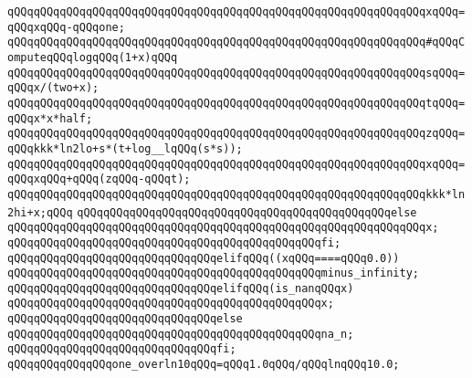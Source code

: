 \verb|qQQqqQQqqQQqqQQqqQQqqQQqqQQqqQQqqQQqqQQqqQQqqQQqqQQqqQQqqQQqqQQqxqQQq=qQQqxqQQq-qQQqone;|\newline
\newline
\verb|qQQqqQQqqQQqqQQqqQQqqQQqqQQqqQQqqQQqqQQqqQQqqQQqqQQqqQQqqQQqqQQq#qQQqComputeqQQqlogqQQq(1+x)qQQq|\newline
\newline
\verb|qQQqqQQqqQQqqQQqqQQqqQQqqQQqqQQqqQQqqQQqqQQqqQQqqQQqqQQqqQQqqQQqsqQQq=qQQqx/(two+x);|\newline
\verb|qQQqqQQqqQQqqQQqqQQqqQQqqQQqqQQqqQQqqQQqqQQqqQQqqQQqqQQqqQQqqQQqtqQQq=qQQqx*x*half;|\newline
\verb|qQQqqQQqqQQqqQQqqQQqqQQqqQQqqQQqqQQqqQQqqQQqqQQqqQQqqQQqqQQqqQQqzqQQq=qQQqkkk*ln2lo+s*(t+log__lqQQq(s*s));|\newline
\verb|qQQqqQQqqQQqqQQqqQQqqQQqqQQqqQQqqQQqqQQqqQQqqQQqqQQqqQQqqQQqqQQqxqQQq=qQQqxqQQq+qQQq(zqQQq-qQQqt);|\newline
\newline
\verb|qQQqqQQqqQQqqQQqqQQqqQQqqQQqqQQqqQQqqQQqqQQqqQQqqQQqqQQqqQQqqQQqkkk*ln2hi+x;qQQq|\newline
\newline
\verb|qQQqqQQqqQQqqQQqqQQqqQQqqQQqqQQqqQQqqQQqqQQqqQQqelse|\newline
\verb|qQQqqQQqqQQqqQQqqQQqqQQqqQQqqQQqqQQqqQQqqQQqqQQqqQQqqQQqqQQqqQQqx;|\newline
\verb|qQQqqQQqqQQqqQQqqQQqqQQqqQQqqQQqqQQqqQQqqQQqqQQqfi;|\newline
\newline
\verb|qQQqqQQqqQQqqQQqqQQqqQQqqQQqqQQqelifqQQq((xqQQq====qQQq0.0))|\newline
\newline
\verb|qQQqqQQqqQQqqQQqqQQqqQQqqQQqqQQqqQQqqQQqqQQqqQQqminus_infinity;|\newline
\newline
\verb|qQQqqQQqqQQqqQQqqQQqqQQqqQQqqQQqelifqQQq(is_nanqQQqx)|\newline
\newline
\verb|qQQqqQQqqQQqqQQqqQQqqQQqqQQqqQQqqQQqqQQqqQQqqQQqx;|\newline
\verb|qQQqqQQqqQQqqQQqqQQqqQQqqQQqqQQqelse|\newline
\verb|qQQqqQQqqQQqqQQqqQQqqQQqqQQqqQQqqQQqqQQqqQQqqQQqna_n;|\newline
\verb|qQQqqQQqqQQqqQQqqQQqqQQqqQQqqQQqfi;|\newline
\newline
\verb|qQQqqQQqqQQqqQQqone_overln10qQQq=qQQq1.0qQQq/qQQqlnqQQq10.0;|\newline
